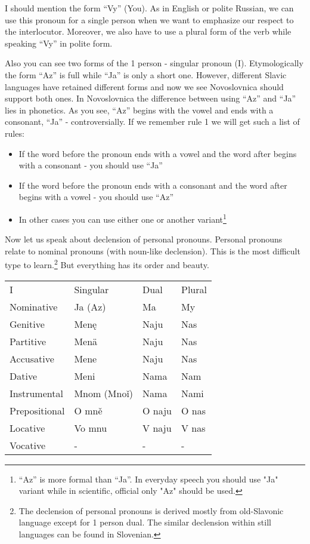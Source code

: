 I should mention the form “Vy” (You). As in English or polite Russian, we can use this pronoun for a single person when we want to emphasize our respect to the interlocutor. Moreover, we also have to use a plural form of the verb while speaking “Vy” in polite form.

Also you can see two forms of the 1 person - singular pronoun (I). Etymologically the form “Az” is full while “Ja” is only a short one. However, different Slavic languages have retained different forms and now we see Novoslovnica should support both ones. In Novoslovnica the difference between using “Az” and “Ja” lies in phonetics. As you see, “Az” begins with the vowel and ends with a consonant, “Ja” - controversially. If we remember rule 1 we will get such a list of rules:

\begin{itemize}
	\item If the word before the pronoun ends with a vowel and the word after begins with a consonant - you should use “Ja”
	\item If the word before the pronoun ends with a consonant and the word after begins with a vowel - you should use “Az”
	\item In other cases you can use either one or another variant\footnote{“Az” is more formal than “Ja”. In everyday speech you should use "Ja" variant while in scientific, official only "Az" should be used.}
\end{itemize}

Now let us speak about declension of personal pronouns. Personal pronouns relate to nominal pronouns (with noun-like declension). This is the most difficult type to learn.\footnote{The declension of personal pronouns is derived mostly from old-Slavonic language except for 1 person dual. The similar declension within still languages can be found in Slovenian.} But everything has its order and beauty.

\begin{table}[!htb]
	\begin{tabular}{llll}
		I & Singular & Dual & Plural \\
		Nominative & Ja (Az) & Ma & My \\
		Genitive & Menę & Naju & Nas \\
		Partitive & Menä & Naju & Nas \\
		Accusative & Mene & Naju & Nas \\
		Dative & Meni & Nama & Nam \\
		Instrumental & Mnom (Mnoǐ) & Nama & Nami \\
		Prepositional & O mně & O naju & O nas \\
		Locative & Vo mnu & V naju & V nas \\
		Vocative & - & - & -
	\end{tabular}
\end{table}

